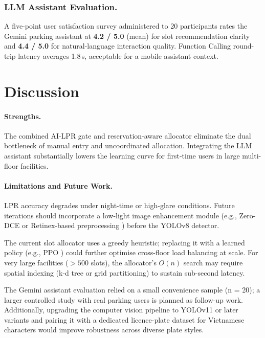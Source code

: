 \documentclass[runningheads]{llncs}
\begin{document}
\subsubsection{LLM Assistant Evaluation.}

A five-point user satisfaction survey administered to
20 participants rates the Gemini parking assistant at
\textbf{4.2 / 5.0} (mean) for slot recommendation clarity
and \textbf{4.4 / 5.0} for natural-language interaction
quality. Function Calling round-trip latency averages
1.8\,s, acceptable for a mobile assistant context.

\section{Discussion}
\label{sec:discuss}

\paragraph{Strengths.}
The combined AI-LPR gate and reservation-aware allocator
eliminate the dual bottleneck of manual entry and
uncoordinated allocation. Integrating the LLM assistant
substantially lowers the learning curve for first-time users
in large multi-floor facilities.

\paragraph{Limitations and Future Work.}
LPR accuracy degrades under night-time or high-glare
conditions. Future iterations should incorporate a
low-light image enhancement module (e.g., Zero-DCE or
Retinex-based preprocessing \cite{ref_padmavathi2024})
before the YOLOv8 detector.

The current slot allocator uses a greedy heuristic;
replacing it with a learned policy (e.g., PPO
\cite{ref_ieee_multilevel2024}) could further optimise
cross-floor load balancing at scale. For very large
facilities ($> 500$ slots), the allocator's $O(n)$ search
may require spatial indexing (k-d tree or grid partitioning)
to sustain sub-second latency.

The Gemini assistant evaluation relied on a small
convenience sample (n = 20); a larger controlled study with
real parking users is planned as follow-up work.
Additionally, upgrading the computer vision pipeline to
YOLOv11 or later variants \cite{ref_chang2026} and
pairing it with a dedicated licence-plate dataset for
Vietnamese characters would improve robustness across
diverse plate styles.
\end{document}
